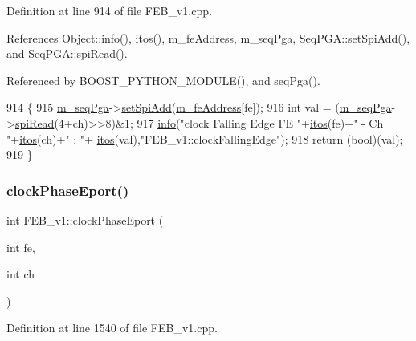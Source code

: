 Definition at line 914 of file F\+E\+B\+\_\+v1.\+cpp.



References Object\+::info(), itos(), m\+\_\+fe\+Address, m\+\_\+seq\+Pga, Seq\+P\+G\+A\+::set\+Spi\+Add(), and Seq\+P\+G\+A\+::spi\+Read().



Referenced by B\+O\+O\+S\+T\+\_\+\+P\+Y\+T\+H\+O\+N\+\_\+\+M\+O\+D\+U\+L\+E(), and seq\+Pga().


\begin{DoxyCode}
914                                               \{
915   \hyperlink{classFEB__v1_a6c7804ac86796f233a8393043adf2e77}{m\_seqPga}->\hyperlink{classSeqPGA_ac998ce3a6d9b5f2e88cc8393f8c1df53}{setSpiAdd}(\hyperlink{classFEB__v1_a4e1945c2d5b434125f375e9d0fc6d99f}{m\_feAddress}[fe]);
916   \textcolor{keywordtype}{int} val = (\hyperlink{classFEB__v1_a6c7804ac86796f233a8393043adf2e77}{m\_seqPga}->\hyperlink{classSeqPGA_ab3d0e5e5d4014bc7a92588a76b8713d4}{spiRead}(4+ch)>>8)&1;
917   \hyperlink{classObject_a644fd329ea4cb85f54fa6846484b84a8}{info}(\textcolor{stringliteral}{"clock Falling Edge FE "}+\hyperlink{Tools_8h_af330027dbdafb9a30768b3613c553e60}{itos}(fe)+\textcolor{stringliteral}{" - Ch "}+\hyperlink{Tools_8h_af330027dbdafb9a30768b3613c553e60}{itos}(ch)+\textcolor{stringliteral}{" : "}+
      \hyperlink{Tools_8h_af330027dbdafb9a30768b3613c553e60}{itos}(val),\textcolor{stringliteral}{"FEB\_v1::clockFallingEdge"});
918   \textcolor{keywordflow}{return} (\textcolor{keywordtype}{bool})(val);
919 \}
\end{DoxyCode}
\mbox{\label{classFEB__v1_aab32d0b274dfb55f1c2894ff3d08eaba}} 
\subsubsection{\texorpdfstring{clock\+Phase\+Eport()}{clockPhaseEport()}}
{\footnotesize\ttfamily int F\+E\+B\+\_\+v1\+::clock\+Phase\+Eport (\begin{DoxyParamCaption}\item[{int}]{fe,  }\item[{int}]{ch }\end{DoxyParamCaption})}



Definition at line 1540 of file F\+E\+B\+\_\+v1.\+cpp.



